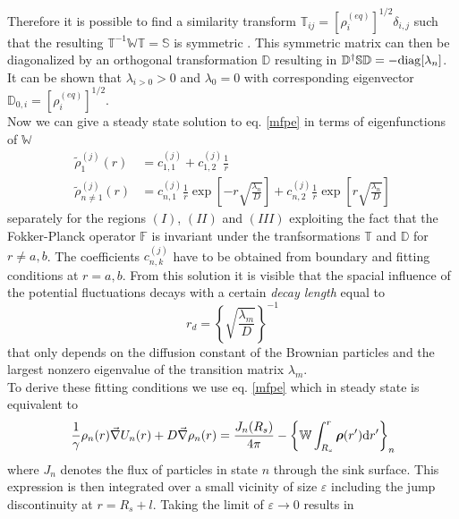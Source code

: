\documentclass[twocolumn,superscriptaddress]{revtex4}
\newcommand{\vect}[1]{\boldsymbol{\mathbf{#1}}}
\begin{document}
Therefore it is possible to find a similarity transform $\mathbb{T}_{ij}=[\rho_i^{(eq)}]^{1/2}\delta_{i,j}$ such that the resulting $\mathbb{T}^{-1}\mathbb{W}\mathbb{T} = \mathbb{S}$ is symmetric \cite{Oppenheim1977}. This symmetric matrix can then be diagonalized by an orthogonal transformation $\mathbb{D}$ resulting in $\mathbb{D}^{\dagger}\mathbb{S}\mathbb{D} = - {\rm diag}[\lambda_n]$. It can be shown \cite{VanKampen1992} that $\lambda_{i>0}>0$ and $\lambda_0=0$ with corresponding eigenvector $\mathbb{D}_{0,i}=[\rho_i^{(eq)}]^{1/2}$.  \\
Now we can give a steady state solution to eq. \eqref{mfpe} in terms of eigenfunctions of $\mathbb{W}$
\begin{align}
    \label{solution}
    \tilde{\rho}_{1}^{(j)}(r) &= c_{1,1}^{(j)} + c_{1,2}^{(j)} \frac{1}{r} \\
    \tilde{\rho}_{n \ne 1}^{(j)}(r) &= c_{n,1}^{(j)}\frac{1}{r} \exp\left[-r\sqrt{\frac{\lambda_n}{D}}\right] + c_{n,2}^{(j)}\frac{1}{r} \exp\left[r\sqrt{\frac{\lambda_n}{D}}\right]  \nonumber
\end{align}
separately for the regions $(I)$, $(II)$ and $(III)$ exploiting the fact that the Fokker-Planck operator $\mathbb{F}$ is invariant under the tranfsormations $\mathbb{T}$ and $\mathbb{D}$ for $r\ne a, b$. The coefficients $c^{(j)}_{n,k}$ have to be obtained from boundary and fitting conditions at $r=a,b$. From this solution it is visible that the spacial influence of the potential fluctuations decays with a certain \textit{decay length} equal to
\begin{equation}
    r_d = \left\{\sqrt{\frac{\lambda_m}{D}}\right\}^{-1}
    \label{decay_length}
\end{equation}
that only depends on the diffusion constant of the Brownian particles and the largest nonzero eigenvalue of the transition matrix $\lambda_m$.\\
To derive these fitting conditions we use eq. \eqref{mfpe} which in steady state is equivalent to
\begin{equation*}
     \frac{1}{\gamma}\rho_n(r) \vec{\nabla} U_n(r) + D \vec{\nabla} \rho_n(r) = \frac{J_n(R_s)}{4 \pi} - \left\{ \mathbb{W} \int_{R_s}^{r} \vect{\rho}(r') {\rm d} r' \right\}_{n}
\end{equation*}
where $J_n$ denotes the flux of particles in state $n$ through the sink surface. This expression is then integrated over a small vicinity of size $\varepsilon$ including the jump discontinuity at $r = R_s+l$. Taking the limit of $\varepsilon \rightarrow 0$ results in 
\end{document}
